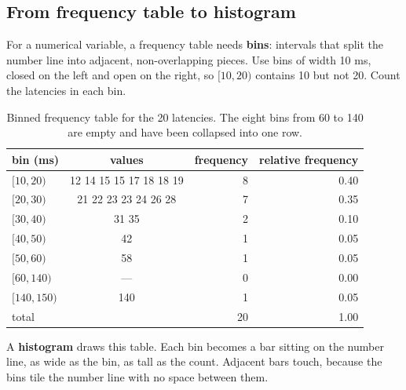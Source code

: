\subsection{From frequency table to histogram}

For a numerical variable, a frequency table needs \textbf{bins}: intervals that split the
number line into adjacent, non-overlapping pieces. Use bins of width 10 ms, closed on the left
and open on the right, so $[10,20)$ contains 10 but not 20. Count the latencies in each bin.

\begin{table}[H]
\centering
\begin{tabular}{lcrr}
\toprule
bin (ms) & values & frequency & relative frequency\\
\midrule
$[10,20)$ & 12 14 15 15 17 18 18 19 & 8 & 0.40\\
$[20,30)$ & 21 22 23 23 24 26 28 & 7 & 0.35\\
$[30,40)$ & 31 35 & 2 & 0.10\\
$[40,50)$ & 42 & 1 & 0.05\\
$[50,60)$ & 58 & 1 & 0.05\\
$[60,140)$ & --- & 0 & 0.00\\
$[140,150)$ & 140 & 1 & 0.05\\
\midrule
total & & 20 & 1.00\\
\bottomrule
\end{tabular}
\caption{Binned frequency table for the 20 latencies. The eight bins from 60 to 140 are
empty and have been collapsed into one row.}
\label{tab:data-latency-bins}
\end{table}

A \textbf{histogram} draws this table. Each bin becomes a bar sitting on the number line, as
wide as the bin, as tall as the count. Adjacent bars touch, because the bins tile the number
line with no space between them.

